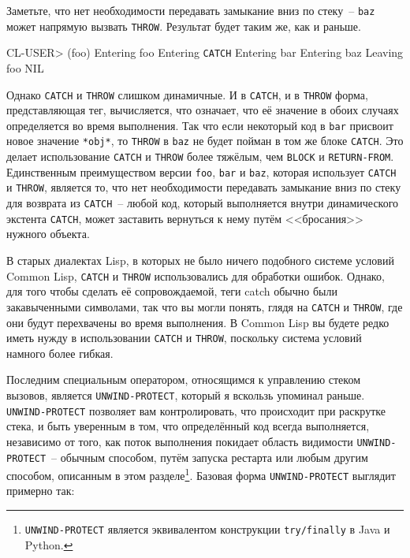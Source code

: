 Заметьте, что нет необходимости передавать замыкание вниз по стеку~-- \lstinline{baz} может
напрямую вызвать \lstinline{THROW}.  Результат будет таким же, как и раньше.

\begin{myverb}
  CL-USER> (foo)
  Entering foo
   Entering \lstinline{CATCH}
    Entering bar
     Entering baz
  Leaving foo
  NIL
\end{myverb}

Однако \lstinline{CATCH} и \lstinline{THROW} слишком динамичные.  И в \lstinline{CATCH}, и в
\lstinline{THROW} форма, представляющая тег, вычисляется, что означает, что её значение в
обоих случаях определяется во время выполнения.  Так что если некоторый код в \lstinline{bar}
присвоит новое значение \lstinline{*obj*}, то \lstinline{THROW} в \lstinline{baz} не будет пойман в том
же блоке \lstinline{CATCH}.  Это делает использование \lstinline{CATCH} и \lstinline{THROW} более тяжёлым,
чем \lstinline{BLOCK} и \lstinline{RETURN-FROM}. Единственным преимуществом версии \lstinline{foo},
\lstinline{bar} и \lstinline{baz}, которая использует \lstinline{CATCH} и \lstinline{THROW}, является то, что
нет необходимости передавать замыкание вниз по стеку для возврата из \lstinline{CATCH}~--
любой код, который выполняется внутри динамического экстента \lstinline{CATCH}, может заставить
вернуться к нему путём <<бросания>>  нужного объекта.

В старых диалектах Lisp, в которых не было ничего подобного системе условий Common Lisp,
\lstinline{CATCH} и \lstinline{THROW} использовались для обработки ошибок.  Однако, для того чтобы
сделать её сопровождаемой, теги catch обычно были закавыченными символами, так что вы могли
понять, глядя на \lstinline{CATCH} и \lstinline{THROW}, где они будут перехвачены во время
выполнения. В Common Lisp вы будете редко иметь нужду в использовании \lstinline{CATCH} и
\lstinline{THROW}, поскольку система условий намного более гибкая.

Последним специальным оператором, относящимся к управлению стеком вызовов, является
\lstinline{UNWIND-PROTECT}, который я вскользь упоминал раньше. \lstinline{UNWIND-PROTECT} позволяет
вам контролировать, что происходит при раскрутке стека, и быть уверенным в том, что
определённый код всегда выполняется, независимо от того, как поток выполнения покидает
область видимости \lstinline{UNWIND-PROTECT}~-- обычным способом, путём запуска рестарта или
любым другим способом, описанным в этом разделе\footnote{\lstinline{UNWIND-PROTECT} является
  эквивалентом конструкции \lstinline{try/finally} в Java и Python.}.  Базовая форма
\lstinline{UNWIND-PROTECT} выглядит примерно так:

